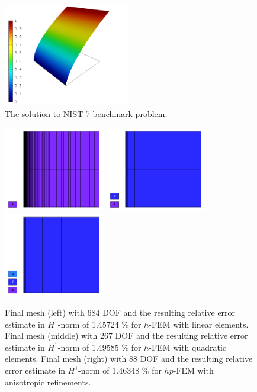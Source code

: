 \documentclass[12pt]{elsarticle}
\begin{document}
\begin{figure}[H]
\centering
\vspace{-3mm}
\includegraphics[height=4.5cm]{nist/nist-7/solution.png}
\caption{The solution to NIST-7 benchmark problem.}
\label{fig:sln-nist07}
\end{figure}

\begin{figure}[H]
\centering
\vspace{-3mm}
\includegraphics[height=3.7cm]{nist/nist-7/mesh_h1_aniso.png}
\includegraphics[height=3.7cm]{nist/nist-7/mesh_h2_aniso.png}
\includegraphics[height=3.7cm]{nist/nist-7/mesh_hp_aniso.png}
\vspace{-3mm}
\caption{
Final mesh (left) with 684 DOF and the resulting
relative error estimate in $H^1$-norm of 1.45724 \% for $h$-FEM with linear elements.
Final mesh (middle) with 267 DOF and the resulting
relative error estimate in $H^1$-norm of 1.49585 \% for $h$-FEM with quadratic elements.
Final mesh (right) with 88 DOF and the resulting
relative error estimate in $H^1$-norm of 1.46348 \% for $hp$-FEM with anisotropic refinements.}
\label{fig:nist-7-hp-aniso}
\end{figure}
\end{document}
